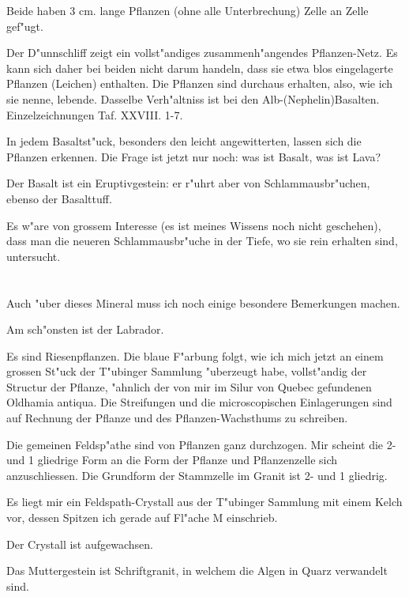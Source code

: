 \documentclass[a4paper, 11pt, oneside, german]{article}
\begin{document}
Beide haben 3 cm. lange Pflanzen (ohne alle Unterbrechung) Zelle an Zelle gef"ugt.

Der D"unnschliff zeigt ein vollst"andiges zusammenh"angendes Pflanzen-Netz. Es kann sich daher bei beiden nicht darum handeln, dass sie etwa blos eingelagerte Pflanzen (Leichen) enthalten. Die Pflanzen sind durchaus erhalten, also, wie ich sie nenne, lebende. Dasselbe Verh"altniss ist bei den Alb-(Nephelin)Basalten. Einzelzeichnungen Taf. XXVIII. 1-7.

In jedem Basaltst"uck, besonders den leicht angewitterten, lassen sich die Pflanzen erkennen. Die Frage ist jetzt nur noch: was ist Basalt, was ist Lava?

Der Basalt ist ein Eruptivgestein: er r"uhrt aber von Schlammausbr"uchen, ebenso der Basalttuff.

Es w"are von grossem Interesse (es ist meines Wissens noch nicht geschehen), dass man die neueren Schlammausbr"uche in der Tiefe, wo sie rein erhalten sind, untersucht.
\clearpage
\section{}
\paragraph{}
Auch "uber dieses Mineral muss ich noch einige besondere Bemerkungen machen.

Am sch"onsten ist der Labrador.

Es sind Riesenpflanzen. Die blaue F"arbung folgt, wie ich mich jetzt an einem grossen St"uck der T"ubinger Sammlung "uberzeugt habe, vollst"andig der Structur der Pflanze, "ahnlich der von mir im Silur von Quebec gefundenen Oldhamia antiqua. Die Streifungen und die microscopischen Einlagerungen sind auf Rechnung der Pflanze und des Pflanzen-Wachsthums zu schreiben.

Die gemeinen Feldsp"athe sind von Pflanzen ganz durchzogen. Mir scheint die 2- und 1 gliedrige Form an die Form der Pflanze und Pflanzenzelle sich anzuschliessen. Die Grundform der Stammzelle im Granit ist 2- und 1 gliedrig.

Es liegt mir ein Feldspath-Crystall aus der T"ubinger Sammlung mit einem Kelch vor, dessen Spitzen ich gerade auf Fl"ache M einschrieb.

Der Crystall ist aufgewachsen.

Das Muttergestein ist Schriftgranit, in welchem die Algen in Quarz verwandelt sind.
\end{document}
